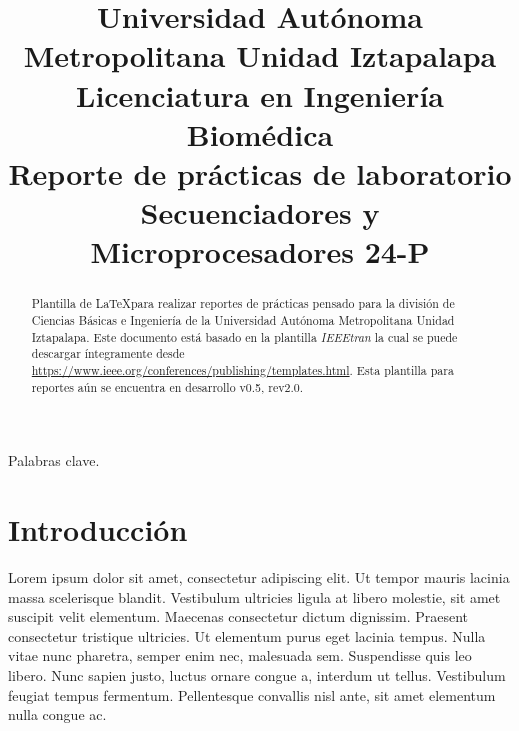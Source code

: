 \documentclass[conference]{IEEEtran}
\begin{document}
\title{\LARGE Universidad Autónoma Metropolitana Unidad Iztapalapa\\
{\Large Licenciatura en Ingeniería Biomédica\\
Reporte de prácticas de laboratorio\\
Secuenciadores y Microprocesadores 24-P}
}

\author{
\and
{}
\and
{}
}

\maketitle

\begin{abstract}
Plantilla de \LaTeX para realizar reportes de prácticas pensado para la división de Ciencias Básicas e Ingeniería de la Universidad Autónoma Metropolitana Unidad Iztapalapa. Este documento está basado en la plantilla \textit{IEEEtran} la cual se puede descargar íntegramente desde \url{https://www.ieee.org/conferences/publishing/templates.html}. Esta plantilla para reportes aún se encuentra en desarrollo v0.5, rev2.0.
\end{abstract}

\begin{IEEEkeywords}
Palabras clave.
\end{IEEEkeywords}

\section{Introducción}
Lorem ipsum dolor sit amet, consectetur adipiscing elit. Ut tempor mauris lacinia massa scelerisque blandit. Vestibulum ultricies ligula at libero molestie, sit amet suscipit velit elementum. Maecenas consectetur dictum dignissim. Praesent consectetur tristique ultricies. Ut elementum purus eget lacinia tempus. Nulla vitae nunc pharetra, semper enim nec, malesuada sem. Suspendisse quis leo libero. Nunc sapien justo, luctus ornare congue a, interdum ut tellus. Vestibulum feugiat tempus fermentum. Pellentesque convallis nisl ante, sit amet elementum nulla congue ac.
\end{document}
